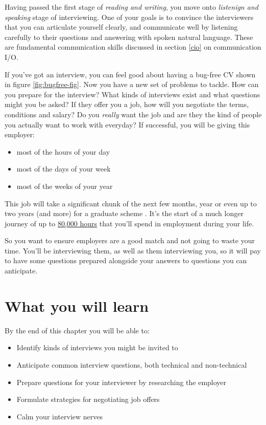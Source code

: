 \documentclass[
]{book}
\providecommand{\tightlist}{%
  \setlength{\itemsep}{0pt}\setlength{\parskip}{0pt}}
\begin{document}
Having passed the first stage of \emph{reading and writing}, you move onto \emph{listenign and speaking} stage of interviewing. One of your goals is to convince the interviewers that you can articulate yourself clearly, and communicate well by listening carefully to their questions and answering with spoken natural language. These are fundamental communication skills discussed in section \ref{cio} on communication I/O.

If you've got an interview, you can feel good about having a bug-free CV shown in figure \ref{fig:bugfree-fig}. Now you have a new set of problems to tackle. How can you prepare for the interview? What kinds of interviews exist and what questions might you be asked? If they offer you a job, how will you negotiate the terms, conditions and salary? Do you \emph{really} want the job and are they the kind of people you actually want to work with everyday? If successful, you will be giving this employer:

\begin{itemize}
\tightlist
\item
  most of the hours of your day
\item
  most of the days of your week
\item
  most of the weeks of your year
\end{itemize}

This job will take a significant chunk of the next few months, year or even up to two years (and more) for a graduate scheme \citep{jonathanblack}. It's the start of a much longer journey of up to \href{https://80000hours.org/}{80,000 hours} that you'll spend in employment during your life.

So you want to ensure employers are a good match and not going to waste your time. You'll be interviewing them, as well as them interviewing you, so it will pay to have some questions prepared alongside your answers to questions you can anticipate.

\hypertarget{ilo9}{%
\section{What you will learn}\label{ilo9}}

By the end of this chapter you will be able to:

\begin{itemize}
\tightlist
\item
  Identify kinds of interviews you might be invited to
\item
  Anticipate common interview questions, both technical and non-technical
\item
  Prepare questions for your interviewer by researching the employer
\item
  Formulate strategies for negotiating job offers
\item
  Calm your interview nerves
\end{itemize}
\end{document}
